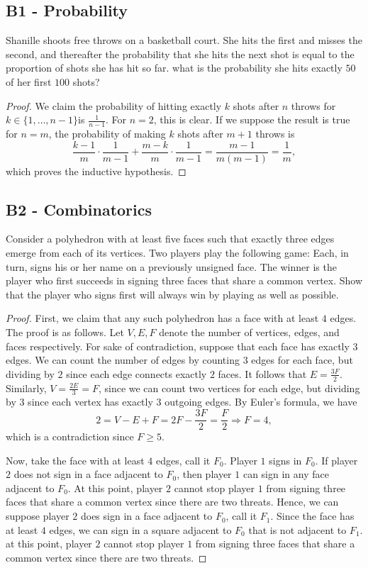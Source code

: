 \documentclass[11pt]{scrartcl}
\newcommand{\<}{\langle}
\renewcommand{\>}{\rangle}
\begin{document}
\subsection{B1 - Probability}
Shanille shoots free throws on a basketball court.  She hits the first and misses the second, and thereafter the probability that she hits the next shot is equal to the proportion of shots she has hit so far.  what is the probability she hits exactly $50$ of her first $100$ shots?
\begin{proof}
We claim the probability of hitting exactly $k$ shots after $n$ throws for $k \in \{1, \dots, n-1\}$is $\frac{1}{n-1}$.  For $n = 2$, this is clear.  If we suppose the result is true for $n = m$, the probability of making $k$ shots after $m + 1$ throws is 
$$\frac{k-1}{m} \cdot \frac{1}{m-1} + \frac{m - k}{m} \cdot \frac{1}{m-1} = \frac{m-1}{m(m-1)} = \frac{1}{m},$$
which proves the inductive hypothesis.  

\end{proof}

\subsection{B2 - Combinatorics}
Consider a polyhedron with at least five faces such that exactly three edges emerge from each of its vertices. Two players play the following game: Each, in turn, signs his or her name on a previously unsigned face. The winner is the player who first succeeds in signing three faces that share a common vertex. Show that the player who signs first will always win by playing as well as possible.
\begin{proof}
First, we claim that any such polyhedron has a face with at least $4$ edges.  The proof is as follows.  Let $V, E, F$ denote the number of vertices, edges, and faces respectively.  For sake of contradiction, suppose that each face has exactly $3$ edges.  We can count the number of edges by counting $3$ edges for each face, but dividing by $2$ since each edge connects exactly $2$ faces.  It follows that $E = \frac{3F}{2}$.  Similarly, $V = \frac{2E}{3} = F$, since we can count two vertices for each edge, but dividing by $3$ since each vertex has exactly $3$ outgoing edges.  By Euler's formula, we have 
$$2 = V - E + F = 2F - \frac{3F}{2} = \frac{F}{2} \Longrightarrow F = 4,$$
which is a contradiction since $F \ge 5$.  

Now, take the face with at least $4$ edges, call it $F_0$.  Player $1$ signs in $F_0$.  If player $2$ does not sign in a face adjacent to $F_0$, then player $1$ can sign in any face adjacent to $F_0$.  At this point, player $2$ cannot stop player $1$ from signing three faces that share a common vertex since there are two threats.  Hence, we can suppose player $2$ does sign in a face adjacent to $F_0$, call it $F_1$.  Since the face has at least $4$ edges, we can sign in a square adjacent to $F_0$ that is not adjacent to $F_1$.  at this point, player $2$ cannot stop player $1$ from signing three faces that share a common vertex since there are two threats.  
\end{proof}
\end{document}
